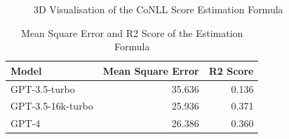 \begin{figure}[htpb]
  \centering
  \quad 
  \caption[CoNLL Score Estimation]{3D Visualisation of the CoNLL Score Estimation Formula}\label{fig:esimated-conll}
\end{figure}


\begin{table}[h]
    \centering
    \begin{tabular}{lrr}
        \hline
        Model & Mean Square Error & R2 Score \\
        \hline
        GPT-3.5-turbo & 35.636 & 0.136 \\
        GPT-3.5-16k-turbo & 25.936 & 0.371 \\
        GPT-4 & 26.386 & 0.360 \\
        \hline
    \end{tabular}
    \caption{Mean Square Error and R2 Score of the Estimation Formula}
    \label{tab:mse-r2}
\end{table}

